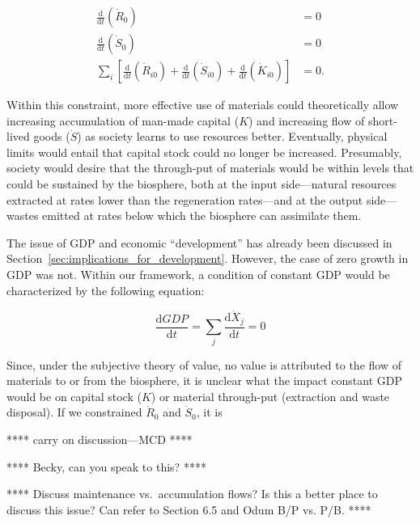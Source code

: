 \begin{align}\label{eq:const_throughput}
	\frac{\mathrm{d}}{\mathrm{d}t}\left(\dot{R}_{0}\right)		&
	= 0																							\\
	\frac{\mathrm{d}}{\mathrm{d}t}\left(\dot{S}_{0}\right)		&
	= 0																						\\
	\sum\limits_{i}
			\left[
				\frac{\mathrm{d}}{\mathrm{d}t}\left(\dot{R}_{i0}\right)
				+ \frac{\mathrm{d}}{\mathrm{d}t}\left(\dot{S}_{i0}\right)
				+ \frac{\mathrm{d}}{\mathrm{d}t}\left(\dot{K}_{i0}\right)
			\right]																			&
	= 0.
\end{align}

Within this constraint,
more effective use of materials could
theoretically allow increasing accumulation
of man-made capital ($K$) 
and increasing flow of short-lived goods ($\dot{S}$)
as society learns to use resources better.
Eventually,
physical limits would entail that capital
stock could no longer be increased.
Presumably,
society would desire that the through-put of
materials would be within levels that could
be sustained by the biosphere,
both at the input side---natural 
resources extracted at rates lower
than the regeneration rates---and 
at the output side---wastes emitted 
at rates below which
the biosphere can assimilate them.

The issue of GDP and economic ``development'' 
has already been discussed in 
Section~\ref{sec:implications_for_development}. 
However,
the case of zero growth in GDP was not.
Within our framework,
a condition of constant GDP would be
characterized by the following equation:


\begin{equation}\label{eq:const_GDP}
	\frac{\mathrm{d}GDP}{\mathrm{d}t}
	=	\sum\limits_{j}\frac{\mathrm{d}\dot{X}_{j}}{\mathrm{d}t}
	= 0
\end{equation}

Since,
under the subjective theory of value,
no value is attributed to the flow of materials
to or from the biosphere,
it is unclear what the impact constant GDP would be
on capital stock ($K$)
or material through-put
(extraction and waste disposal).
If we constrained $\dot{R}_{0}$ and
$\dot{S}_{0}$, it is 

**** carry on discussion---MCD ****

**** Becky, can you speak to this? ****

**** Discuss maintenance vs.\ accumulation flows? 
Is this a better place to discuss this issue? Can refer to
Section 6.5 and Odum B/P vs. P/B. ****


